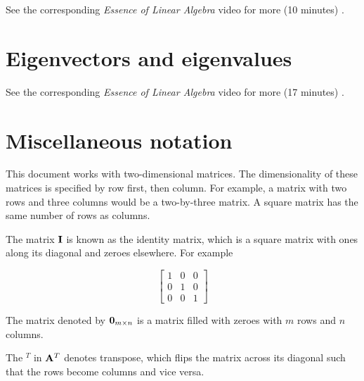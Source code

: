 See the corresponding \textit{Essence of Linear Algebra} video for more (10
minutes) \cite{bib:linalg_the_determinant}.

\section{Eigenvectors and eigenvalues}

See the corresponding \textit{Essence of Linear Algebra} video for more (17
minutes) \cite{bib:linalg_eigenvectors_and_eigenvalues}.

\section{Miscellaneous notation}

This document works with two-dimensional matrices. The dimensionality of these
matrices is specified by row first, then column. For example, a matrix with two
rows and three columns would be a two-by-three matrix. A square matrix has the
same number of rows as columns.

The matrix $\mathbf{I}$ is known as the identity matrix, which is a square matrix
with ones along its diagonal and zeroes elsewhere. For example

\begin{equation*}
  \left[
  \begin{array}{ccc}
    1 & 0 & 0 \\
    0 & 1 & 0 \\
    0 & 0 & 1
  \end{array}
  \right]
\end{equation*}

The matrix denoted by $\mathbf{0}_{m \times n}$ is a matrix filled with zeroes with
$m$ rows and $n$ columns.

The $^T$ in $\mathbf{A}^T$ denotes transpose, which flips the matrix across its
diagonal such that the rows become columns and vice versa.
